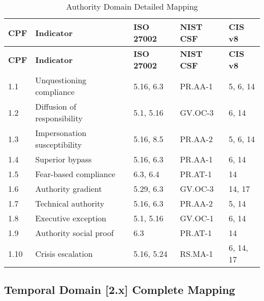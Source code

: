 \documentclass[11pt,a4paper]{article}
\begin{document}
\begin{longtable}{p{1cm}p{4cm}p{2.5cm}p{2.5cm}p{2cm}}
\caption{Authority Domain Detailed Mapping} \\
\toprule
\textbf{CPF} & \textbf{Indicator} & \textbf{ISO 27002} & \textbf{NIST CSF} & \textbf{CIS v8} \\
\midrule
\endfirsthead
\toprule
\textbf{CPF} & \textbf{Indicator} & \textbf{ISO 27002} & \textbf{NIST CSF} & \textbf{CIS v8} \\
\midrule
\endhead
\bottomrule
\endlastfoot

1.1 & Unquestioning compliance & 5.16, 6.3 & PR.AA-1 & 5, 6, 14 \\
1.2 & Diffusion of responsibility & 5.1, 5.16 & GV.OC-3 & 6, 14 \\
1.3 & Impersonation susceptibility & 5.16, 8.5 & PR.AA-2 & 5, 6, 14 \\
1.4 & Superior bypass & 5.16, 6.3 & PR.AA-1 & 6, 14 \\
1.5 & Fear-based compliance & 6.3, 6.4 & PR.AT-1 & 14 \\
1.6 & Authority gradient & 5.29, 6.3 & GV.OC-3 & 14, 17 \\
1.7 & Technical authority & 5.16, 6.3 & PR.AA-2 & 5, 14 \\
1.8 & Executive exception & 5.1, 5.16 & GV.OC-1 & 6, 14 \\
1.9 & Authority social proof & 6.3 & PR.AT-1 & 14 \\
1.10 & Crisis escalation & 5.16, 5.24 & RS.MA-1 & 6, 14, 17 \\

\end{longtable}

\subsection{Temporal Domain [2.x] Complete Mapping}
\end{document}
